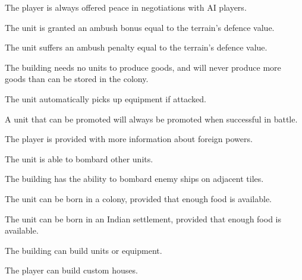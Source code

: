 \documentclass[12pt]{book}
\begin{document}
\affectsPlayer

The player is always offered peace in negotiations with AI players.

\affectsUnit

The unit is granted an ambush bonus equal to the terrain's defence value.

\affectsUnit

The unit suffers an ambush penalty equal to the terrain's defence value.

\affectsBuilding

The building needs no units to produce goods, and will never produce
more goods than can be stored in the colony.

\affectsUnit

The unit automatically picks up equipment if attacked.

\affectsUnit

A unit that can be promoted will always be promoted when successful in
battle.

\affectsPlayer

The player is provided with more information about foreign powers.

\affectsUnit

The unit is able to bombard other units.

\affectsBuilding

The building has the ability to bombard enemy ships on adjacent tiles.

\affectsUnit

The unit can be born in a colony, provided that enough food is available.

\affectsUnit

The unit can be born in an Indian settlement, provided that enough food is available.

\affectsBuilding

The building can build units or equipment.

\affectsPlayer

The player can build custom houses.
\end{document}
